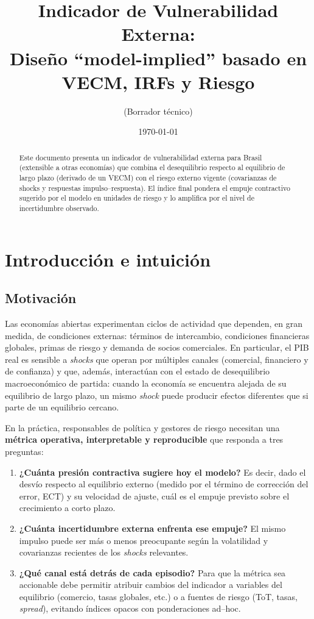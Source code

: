 \documentclass[11pt,a4paper]{article}
\title{Indicador de Vulnerabilidad Externa: \\ 
Diseño “model-implied” basado en VECM, IRFs y Riesgo}
\author{ \small{(Borrador técnico)} }
\date{\today}
\newcommand{\1}{\mathbf{1}}
\begin{document}
\maketitle

\begin{abstract}
Este documento presenta un indicador de vulnerabilidad externa para Brasil (extensible a otras economías) que combina el desequilibrio respecto al equilibrio de largo plazo (derivado de un VECM) con el riesgo externo vigente (covarianzas de shocks y respuestas impulso–respuesta). El índice final pondera el empuje contractivo sugerido por el modelo en unidades de riesgo y lo amplifica por el nivel de incertidumbre observado.
\end{abstract}

\tableofcontents

\section{Introducción e intuición}

\subsection{Motivación}

Las economías abiertas experimentan ciclos de actividad que dependen, en gran medida, de condiciones externas: términos de intercambio, condiciones financieras globales, primas de riesgo y demanda de socios comerciales. En particular, el PIB real es sensible a \emph{shocks} que operan por múltiples canales (comercial, financiero y de confianza) y que, además, interactúan con el estado de desequilibrio macroeconómico de partida: cuando la economía se encuentra alejada de su equilibrio de largo plazo, un mismo \emph{shock} puede producir efectos diferentes que si parte de un equilibrio cercano.

En la práctica, responsables de política y gestores de riesgo necesitan una \textbf{métrica operativa, interpretable y reproducible} que responda a tres preguntas:
\begin{enumerate}
  \item \textbf{¿Cuánta presión contractiva sugiere hoy el modelo?} Es decir, dado el desvío respecto al equilibrio externo (medido por el término de corrección del error, ECT) y su velocidad de ajuste, cuál es el empuje previsto sobre el crecimiento a corto plazo.
  \item \textbf{¿Cuánta incertidumbre externa enfrenta ese empuje?} El mismo impulso puede ser más o menos preocupante según la volatilidad y covarianzas recientes de los \emph{shocks} relevantes.
  \item \textbf{¿Qué canal está detrás de cada episodio?} Para que la métrica sea accionable debe permitir atribuir cambios del indicador a variables del equilibrio (comercio, tasas globales, etc.) o a fuentes de riesgo (ToT, tasas, \emph{spread}), evitando índices opacos con ponderaciones ad--hoc.
\end{enumerate}
\end{document}
